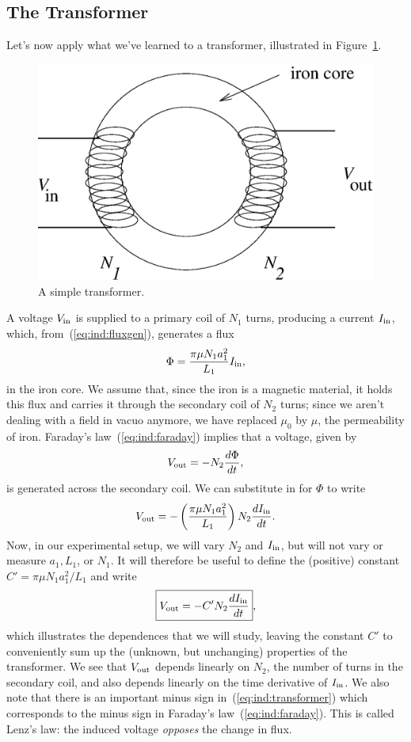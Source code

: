 \subsection{The Transformer}

Let's now apply what we've learned to a transformer, illustrated in 
Figure~\ref{fig:ind:transformer}. 
\begin{figure}[htb]
\centering 
\epsfxsize=10cm \includegraphics[scale=0.6]{6_induction/transformer.eps}
\caption{A simple transformer.}
\label{fig:ind:transformer}
\end{figure}
A voltage $V_{\rm{in}}$ is supplied to a primary coil of $N_1$ turns,
producing a current $I_{\rm{in}}$, which, from~(\ref{eq:ind:fluxgen}),
generates a flux 
$$\Phi= \frac{\pi\mu  N_1 a_1^2}{L_1} I_{\rm{in}},
$$
in the iron core. We assume that, since the iron is a magnetic material, it
holds this flux and carries it through the secondary coil of $N_2$ turns;
since we aren't dealing with a field in vacuo anymore, we have replaced 
$\mu_0$ by $\mu$, the permeability of iron. 
Faraday's law~(\ref{eq:ind:faraday}) implies that a voltage, given by 
$$V_{\rm{out}} = - N_2\frac{d\Phi}{dt},$$  
is generated across the secondary coil.  We can substitute in for $\Phi$ to 
write
$$
V_{\rm{out}} = - \left( \frac{\pi\mu  N_1 a_1^2}{L_1} \right) N_2 
\frac{d I_{\rm{in}}}{dt}.
$$
Now, in our experimental setup, we will vary $N_2$ and $I_{\rm{in}}$, but 
will not vary or measure $a_1,L_1$, or $N_1$. It will therefore be useful to 
define the (positive) constant $C'=\pi\mu  N_1 a_1^2/L_1$ and write
\begin{equation}
\fbox{$ \displaystyle V_{\rm{out}}= -C' N_2 \frac{d I_{\rm{in}}}{dt}$}, \label{eq:ind:transformer}
\end{equation}
which illustrates the dependences that we will study, leaving the constant
$C'$ to conveniently sum up the (unknown, but unchanging) properties of the 
transformer.  We see that $V_{\rm{out}}$ depends linearly on $N_2$, the 
number of turns in the secondary coil, and also depends linearly on the
time derivative of $I_{\rm{in}}$.  We also note that there is an important
minus sign in~(\ref{eq:ind:transformer}) which corresponds to the minus sign
in Faraday's law~(\ref{eq:ind:faraday}). This is called Lenz's law: the induced
voltage {\it opposes} the change in flux.  
  
